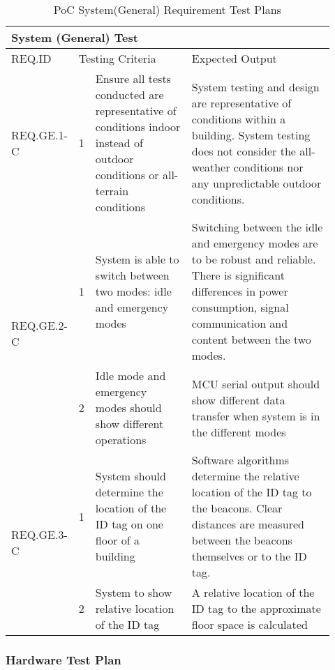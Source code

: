 \begin{table}[h!]
    \centering
    
    \begin{tabular}{|m{0.15\linewidth}|m{0.02\linewidth}|m{0.3\linewidth}|m{0.45\linewidth}|} 
    \hline
    \multicolumn{4}{|l|}{System (General) Test}  \\ 
    \hline
    REQ.ID & \multicolumn{2}{l|}{Testing Criteria} & Expected Output \\ 
    \hline
    REQ.GE.1-C                  
    & 1
    & Ensure all tests conducted are representative of conditions indoor instead of outdoor conditions or all-terrain conditions 
    & System testing and design are representative of conditions within a building. 
    System testing does not consider the all-weather conditions nor any unpredictable outdoor conditions.\\ 
    \hline

    \multirow{2}{*}{REQ.GE.2-C} 
    & 1 
    & System is able to switch between two modes: idle and emergency modes       
    & Switching between the idle and emergency modes are to be robust and reliable. 
    There is significant differences in power consumption, signal communication and content between the two modes. \\ 
    \cline{2-4}
    & 2 
    & Idle mode and emergency modes should show different operations 
    & MCU serial output should show different data transfer when system is in the different modes \\ 
    \hline

    \multirow{2}{*}{REQ.GE.3-C} 
    & 1 
    & System should determine the location of the ID tag on one floor of a building     
    & Software algorithms determine the relative location of the ID tag to the beacons. 
    Clear distances are measured between the beacons themselves or to the ID tag.~\\ 
    \cline{2-4}
    & 2 
    & System to show relative location of the ID tag     
    & A relative location of the ID tag to the approximate floor space is calculated \\
    \hline
    \end{tabular}
    \caption{PoC System(General) Requirement Test Plans}
\end{table}

\break
\subsubsection{Hardware Test Plan}

